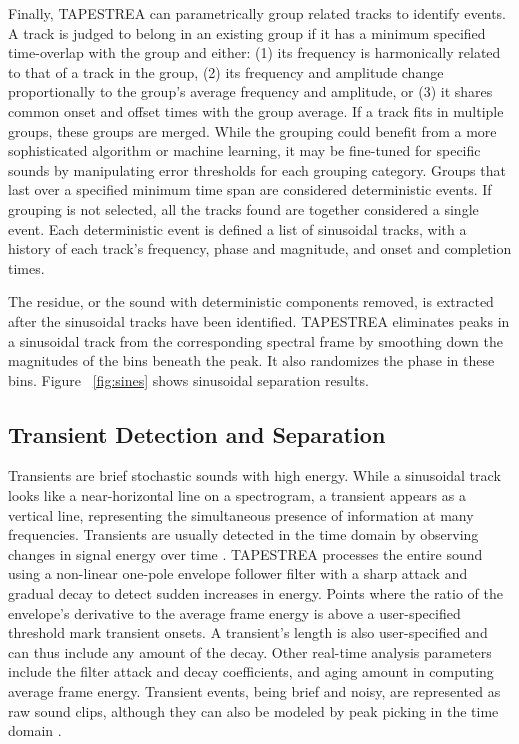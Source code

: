 \documentclass[twoside]{article}
\begin{document}
Finally, TAPESTREA can parametrically group related tracks \cite{paper:85:Ellis94,paper:85:Melih00} 
to identify events. A track is judged to belong in an existing group if it has a 
minimum specified time-overlap with the group and either: (1) its frequency is harmonically 
related to that of a track in the group, (2) its frequency and amplitude 
change proportionally to the group's average frequency and amplitude, 
or (3) it shares common onset and offset times with the group average. If a track 
fits in multiple groups, these groups are merged. While the grouping could 
benefit from a more sophisticated algorithm or machine learning, it may be 
fine-tuned for specific sounds by manipulating error thresholds for each grouping 
category. Groups that last over a specified minimum time span are considered 
deterministic events. If grouping is not selected, all 
the tracks found are together considered a single event. Each deterministic 
event is defined a list of sinusoidal tracks, with 
a history of each track's frequency, phase and magnitude, and onset and completion times. 

The residue, or the sound with deterministic components removed, is extracted 
after the sinusoidal tracks have been identified. TAPESTREA eliminates 
peaks in a sinusoidal track from the corresponding 
spectral frame by smoothing down the magnitudes of the bins beneath the peak. 
It also randomizes the phase in these bins. Figure ~\ref{fig:sines} shows sinusoidal 
separation results. 

\subsection{Transient Detection and Separation}

Transients are brief stochastic sounds with high energy. While a sinusoidal track 
looks like a near-horizontal line on a spectrogram, a transient 
appears as a vertical line, representing the simultaneous presence of information 
at many frequencies. Transients are usually detected in the time domain by observing 
changes in signal energy over time \cite{paper:85:Verma98,paper:85:Bello05}. 
TAPESTREA processes the entire sound
using a non-linear one-pole envelope follower filter with a sharp attack and gradual 
decay to detect sudden increases in energy. Points where the ratio of the envelope's derivative 
to the average frame energy is above a user-specified threshold mark transient onsets. A transient's length  
is also user-specified and can thus include any amount of the decay. Other real-time analysis parameters 
include the filter attack and decay coefficients, and aging amount in computing average frame energy.
Transient events, being brief and noisy, are represented as raw sound clips, although they can also be modeled 
by peak picking in the time domain \cite{paper:85:Verma98}.
\end{document}
